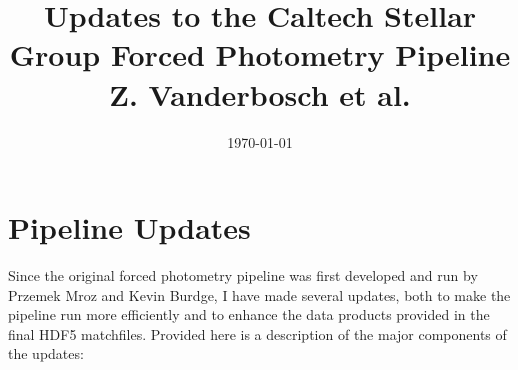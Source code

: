 \documentclass[12pt]{article}
\begin{document}
\vspace{-1cm}
\title{Updates to the Caltech Stellar Group Forced Photometry Pipeline\\ \vspace{0.5cm}
\normalsize{Z. Vanderbosch et al.}}
\vspace{-5cm}
\date{\today}
\maketitle

\section{Pipeline Updates}

Since the original forced photometry pipeline was first developed and run by Przemek Mroz and Kevin Burdge, I have made several updates, both to make the pipeline run more efficiently and to enhance the data products provided in the final HDF5 matchfiles. Provided here is a description of the major components of the updates:
\end{document}
